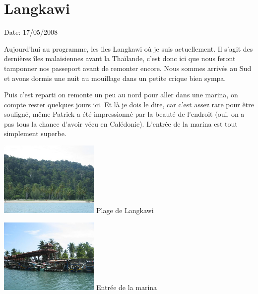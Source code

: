 \section{Langkawi}

Date: 17/05/2008

\begin{multicols}{2}

Aujourd'hui au programme, les iles Langkawi où je suis actuellement. Il s'agit des dernières îles malaisiennes avant la Thaïlande, c'est donc ici que nous feront tamponner nos passeport avant de remonter encore. Nous sommes arrivés au Sud et avons dormis une nuit au mouillage dans un petite crique bien sympa.


Puis c'est reparti on remonte un peu au nord pour aller dans une marina, on compte rester quelques jours ici. Et là je dois le dire, car c'est assez rare pour être souligné, même Patrick a été impressionné par la beauté de l'endroit (oui, on a pas tous la chance d'avoir vécu en Calédonie). L'entrée de la marina est tout simplement superbe.

\hspace*{-0.65cm}
\includegraphics[width=4.8cm]{articles/langkawi/1211018197eneE.jpg}
Plage de Langkawi

\hspace*{-0.65cm}
\includegraphics[width=4.8cm]{articles/langkawi/1211018204F7Ee.jpg}
Entrée de la marina


\end{multicols}
